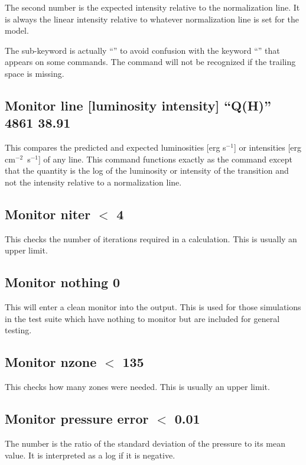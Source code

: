 The second number is the expected intensity relative to the normalization
line.
It is always the linear intensity relative to whatever normalization
line is set for the model.

The sub-keyword is actually ``'' to avoid
confusion with the keyword
``'' that appears on some commands.
The command will not be recognized
if the trailing space is missing.

\subsection{Monitor line [luminosity intensity] ``Q(H)'' 4861 38.91}

This compares the predicted and expected luminosities [erg s$^{-1}$]
or intensities [erg cm$^{-2}$~s$^{-1}$] of any line.
This command functions exactly
as the  command except that the
quantity is the log of the
luminosity or intensity of the transition and not the
intensity relative
to a normalization line.

\subsection{Monitor niter $<$ 4}

This checks the number of iterations required in a calculation.
This is usually an upper limit.

\subsection{Monitor nothing 0}

This will enter a clean monitor into the output.
This is used for those
simulations in the test suite which have nothing to
monitor but are included
for general testing.

\subsection{Monitor nzone $<$ 135}

This checks how many zones were needed.
This is usually an upper limit.

\subsection{Monitor pressure error $<$ 0.01}

The number is the ratio of the standard deviation of the pressure to
its mean value.
It is interpreted as a log if it is negative.

